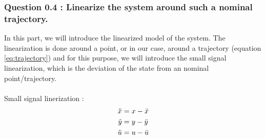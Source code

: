 \subsubsection*{Question 0.4 : Linearize the system around such a nominal trajectory.}
In this part, we will introduce the linearized model of the system. The linearization is done around a point, or in our case, around a trajectory (equation \ref{eq:trajectory}) and for this purpose, we will introduce the small signal linearization, which is the deviation of the state from an nominal point/trajectory.\\
\\
Small signal linerization :
\begin{equation}
    \begin{align}
        \Tilde{x} &= x - \Bar{x}\\
        \Tilde{y} &= y - \Bar{y}\\
        \Tilde{u} &= u - \Bar{u}  
    \end{align}
\end{equation}

